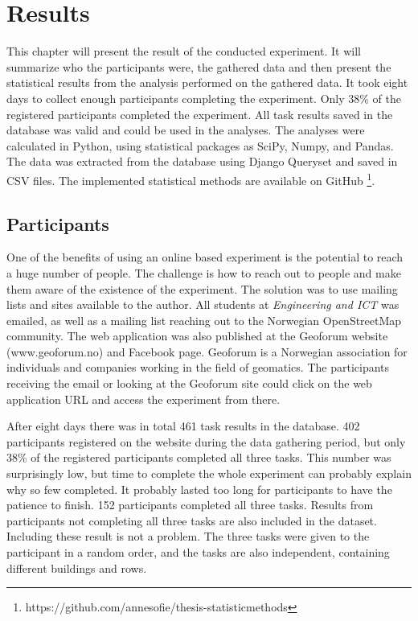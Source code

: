 \chapter{Results}
This chapter will present the result of the conducted experiment. It will summarize who the participants were, the gathered data and then present the statistical results from the analysis performed on the gathered data. It took eight days to collect enough participants completing the experiment. Only 38\% of the registered participants completed the experiment. All task results saved in the database was valid and could be used in the analyses. The analyses were calculated in Python, using statistical packages as SciPy, Numpy, and Pandas. The data was extracted from the database using Django Queryset and saved in CSV files. The implemented statistical methods are available on GitHub \footnote{https://github.com/annesofie/thesis-statisticmethods}. 

\section{Participants}
One of the benefits of using an online based experiment is the potential to reach a huge number of people. The challenge is how to reach out to people and make them aware of the existence of the experiment. The solution was to use mailing lists and sites available to the author. All students at \textit{Engineering and ICT} was emailed, as well as a mailing list reaching out to the Norwegian OpenStreetMap community. The web application was also published at the Geoforum website (www.geoforum.no) and Facebook page. Geoforum is a Norwegian association for individuals and companies working in the field of geomatics. The participants receiving the email or looking at the Geoforum site could click on the web application URL and access the experiment from there. 

After eight days there was in total 461 task results in the database. 402 participants registered on the website during the data gathering period, but only 38\% of the registered participants completed all three tasks. This number was surprisingly low, but time to complete the whole experiment can probably explain why so few completed. It probably lasted too long for participants to have the patience to finish. 152 participants completed all three tasks. Results from participants not completing all three tasks are also included in the dataset. Including these result is not a problem. The three tasks were given to the participant in a random order, and the tasks are also independent, containing different buildings and rows. %

